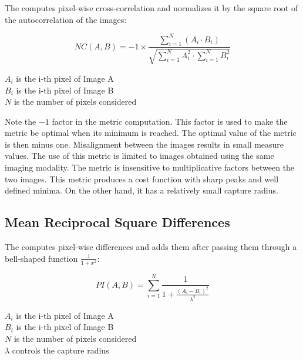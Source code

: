 The  computes pixel-wise
cross-correlation and normalizes it by the square root of the autocorrelation
of the images:

\begin{equation}
NC(A,B) = -1 \times \frac{ \sum_{i=1}^N \left( A_i \cdot B_i \right) }
        { \sqrt { \sum_{i=1}^N A_i^2  \cdot \sum_{i=1}^N B_i^2 } }
\end{equation}
\begin{center}
$A_i$ is the i-th pixel of Image A\\
$B_i$ is the i-th pixel of Image B\\
$N$ is the number of pixels considered
\end{center}

Note the $-1$ factor in the metric computation. This factor is used to make the
metric be optimal when its minimum is reached.  The optimal value of the metric
is then minus one. Misalignment between the images results in small measure
values.  The use of this metric is limited to images obtained using the same
imaging modality.  The metric is insensitive to multiplicative factors between
the two images.  This metric produces a cost function with sharp peaks and well
defined minima.  On the other hand, it has a relatively small capture radius.

\subsection{Mean Reciprocal Square Differences}
\label{sec:MeanReciprocalSquareDifferenceMetric}

The  computes
pixel-wise differences and adds them after passing them through a bell-shaped
function $\frac{1}{1+x^2}$:

\begin{equation}
PI(A,B) =  \sum_{i=1}^N \frac{ 1 }{ 1 + \frac{ \left( A_i - B_i \right) ^ 2}{ \lambda^2 }  }
\end{equation}
\begin{center}
$A_i$ is the i-th pixel of Image A \\
$B_i$ is the i-th pixel of Image B \\
$N$ is the number of pixels considered \\
$\lambda$ controls the capture radius
\end{center}

